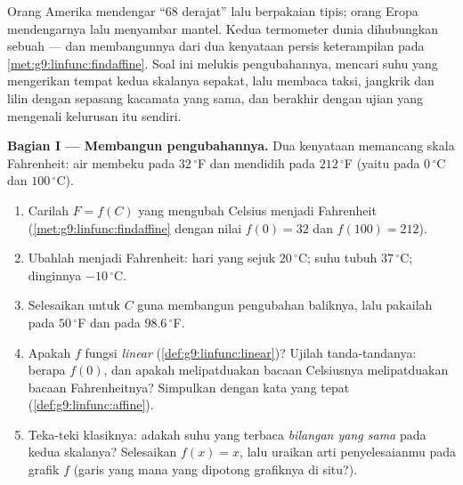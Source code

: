 \begin{problem}
\label{pb:g9:linfunc:1}
Orang Amerika mendengar ``$68$ derajat'' lalu berpakaian tipis; orang
Eropa mendengarnya lalu menyambar mantel. Kedua termometer dunia
dihubungkan sebuah  --- dan membangunnya dari dua kenyataan
persis keterampilan pada \cref{met:g9:linfunc:findaffine}. Soal ini
melukis pengubahannya, mencari suhu yang mengerikan tempat kedua
skalanya sepakat, lalu membaca taksi, jangkrik dan lilin dengan
sepasang kacamata yang sama, dan berakhir dengan ujian yang mengenali
kelurusan itu sendiri.

\medskip
\noindent\textbf{Bagian I --- Membangun pengubahannya.}
Dua kenyataan memancang skala Fahrenheit: air membeku pada
$32\,^\circ$F dan mendidih pada $212\,^\circ$F (yaitu pada $0\,^\circ$C
dan $100\,^\circ$C).
\begin{enumerate}
  \item Carilah  $F = f(C)$ yang mengubah Celsius
        menjadi Fahrenheit (\cref{met:g9:linfunc:findaffine} dengan
        nilai $f(0) = 32$ dan $f(100) = 212$).
  \item Ubahlah menjadi Fahrenheit: hari yang sejuk $20\,^\circ$C;
        suhu tubuh $37\,^\circ$C; dinginnya $-10\,^\circ$C.
  \item Selesaikan untuk $C$ guna membangun pengubahan baliknya, lalu
        pakailah pada $50\,^\circ$F dan pada $98.6\,^\circ$F.
  \item Apakah $f$ fungsi \emph{linear}
        (\cref{def:g9:linfunc:linear})? Ujilah tanda-tandanya:
        berapa $f(0)$, dan apakah melipatduakan bacaan Celsiusnya
        melipatduakan bacaan Fahrenheitnya? Simpulkan dengan kata
        yang tepat (\cref{def:g9:linfunc:affine}).
  \item Teka-teki klasiknya: adakah suhu yang terbaca
        \emph{bilangan yang sama} pada kedua skalanya? Selesaikan
        $f(x) = x$, lalu uraikan arti penyelesaianmu pada
        grafik $f$ (garis yang mana yang dipotong grafiknya di situ?).
\end{enumerate}


\end{problem}
